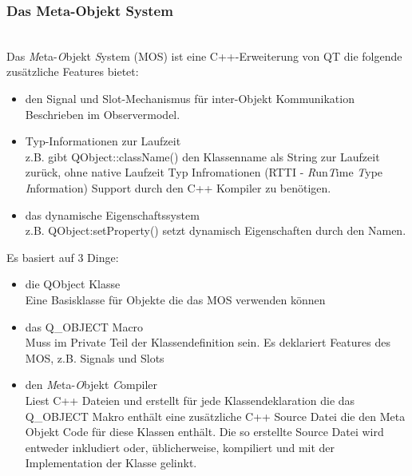 \subsubsection{Das Meta-Objekt System}\mbox{}\\
Das \textit{M}eta-\textit{O}bjekt \textit{S}ystem (MOS) ist eine C++-Erweiterung von QT die folgende zusätzliche Features bietet:
\begin{itemize}
	\item den Signal und Slot-Mechanismus für inter-Objekt Kommunikation\\[\baselineskip]
Beschrieben im Observermodel.
	\item Typ-Informationen zur Laufzeit\\[\baselineskip]
z.B. gibt QObject::className() den Klassenname als String zur Laufzeit zurück, ohne native Laufzeit Typ Infromationen (RTTI - \textit{R}un\textit{T}ime \textit{T}ype \textit{I}nformation) Support durch den C++ Kompiler zu benötigen.
	\item das dynamische Eigenschaftssystem\\[\baselineskip]
z.B. QObject:setProperty() setzt dynamisch Eigenschaften durch den Namen.
\end{itemize}
Es basiert auf 3 Dinge:
\begin{itemize}
	\item die QObject Klasse\\[\baselineskip]
Eine Basisklasse für Objekte die das MOS verwenden können
	\item das Q\_OBJECT Macro\\[\baselineskip]
Muss im Private Teil der Klassendefinition sein. Es deklariert Features des MOS, z.B. Signals und Slots
	\item den \textit{M}eta-\textit{O}bjekt \textit{C}ompiler\\[\baselineskip]
Liest C++ Dateien und erstellt für jede Klassendeklaration die das Q\_OBJECT Makro enthält eine zusätzliche C++ Source Datei die den Meta Objekt Code für diese Klassen enthält. Die so erstellte Source Datei wird entweder inkludiert oder, üblicherweise, kompiliert und mit der Implementation der Klasse gelinkt.
\end{itemize}
\cite{QT_MOC}
\newpage
